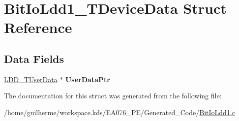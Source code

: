 \hypertarget{struct_bit_io_ldd1___t_device_data}{}\section{Bit\+Io\+Ldd1\+\_\+\+T\+Device\+Data Struct Reference}
\label{struct_bit_io_ldd1___t_device_data}
\subsection*{Data Fields}
\begin{DoxyCompactItemize}
\item 
\mbox{\label{struct_bit_io_ldd1___t_device_data_a35722c4eab944e5887ec51aee9650384}} 
\hyperlink{group___p_e___types__module_ga0b66a73f87238a782318aa0be7578e35}{L\+D\+D\+\_\+\+T\+User\+Data} $\ast$ {\bfseries User\+Data\+Ptr}
\end{DoxyCompactItemize}


The documentation for this struct was generated from the following file\+:\begin{DoxyCompactItemize}
\item 
/home/guilherme/workspace.\+kds/\+E\+A076\+\_\+\+P\+E/\+Generated\+\_\+\+Code/\hyperlink{_bit_io_ldd1_8c}{Bit\+Io\+Ldd1.\+c}\end{DoxyCompactItemize}
